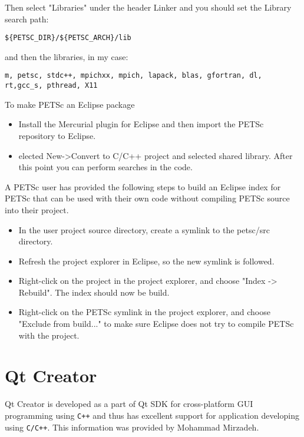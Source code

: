 {{Then select "Libraries" under the header Linker
and you should set the Library search path:
\begin{verbatim}
${PETSC_DIR}/${PETSC_ARCH}/lib
\end{verbatim}


and then the libraries, in my case:
\begin{verbatim}
m, petsc, stdc++, mpichxx, mpich, lapack, blas, gfortran, dl, rt,gcc_s, pthread, X11
\end{verbatim}


To make PETSc an Eclipse package
\begin{itemize}
\item Install the Mercurial plugin for Eclipse and then import the PETSc repository to Eclipse.
\item elected New->Convert to C/C++ project and selected shared library. After this point you can perform searches in the code.
\end{itemize}

  A PETSc user has provided the following steps to build an Eclipse index for PETSc that can be used with their own code without compiling PETSc source into their project.
\begin{itemize}
\item In the user project source directory, create a symlink to the petsc/src directory.
\item Refresh the project explorer in Eclipse, so the new symlink is followed.
\item Right-click on the project in the project explorer, and choose "Index -> Rebuild". The index should now be build.
\item Right-click on the PETSc symlink in the project explorer, and choose "Exclude from build..." to make sure Eclipse does not try to compile PETSc with the project.
\end{itemize}

\section{Qt Creator} 

 Qt Creator is developed as a part of Qt SDK for cross-platform GUI programming using \texttt{C++} and thus has excellent support for application developing using \texttt{C/C++}. This information was provided by Mohammad Mirzadeh.

}}
